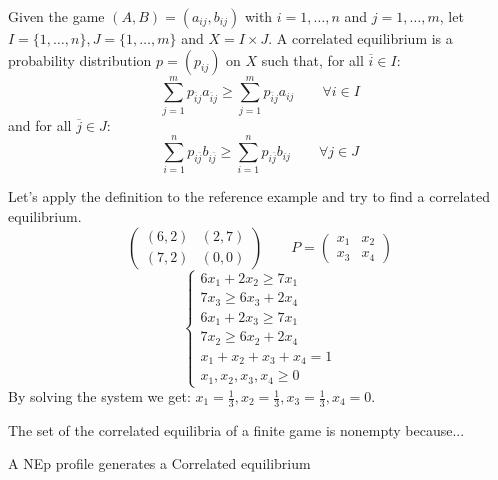 \documentclass[../main.tex]{subfiles}
\begin{document}
\begin{definition}
    Given the game $(A,B) = (a_{ij}, b_{ij})$ with $i = 1, \ldots, n$ and $j = 1, \ldots, m$, let $I = \{1, \ldots, n\}, J = \{1, \ldots, m\}$ and $X = I \times J$. A correlated equilibrium is a probability distribution $p = (p_{ij})$ on $X$ such that, for all $\overline{i} \in I$:
    \begin{equation*}
        \sum_{j=1}^{m} p_{\overline{i}j} a_{\overline{i}j} \geq \sum_{j=1}^{m} p_{\overline{i}j} a_{ij} \qquad \forall i \in I
    \end{equation*}
    and for all $\overline{j} \in J$:
    \begin{equation*}
        \sum_{i=1}^{n} p_{i\overline{j}} b_{i\overline{j}} \geq \sum_{i=1}^{n} p_{i\overline{j}} b_{ij} \qquad \forall j \in J
    \end{equation*}
\end{definition}

\begin{example}
    Let's apply the definition to the reference example and try to find a correlated equilibrium.
    \[
        \begin{pmatrix}
            (6,2) & (2,7) \\
            (7,2) & (0,0)
        \end{pmatrix}
        \qquad
        P = \begin{pmatrix}
            x_1 & x_2 \\
            x_3 & x_4
        \end{pmatrix}
    \]
    \[
        \begin{cases}
            6x_1 + 2x_2 \geq 7 x_1    \\
            7x_3 \geq 6x_3 + 2x_4     \\
            6x_1 + 2x_3 \geq 7 x_1    \\
            7x_2 \geq 6x_2 + 2x_4     \\
            x_1 + x_2 + x_3 + x_4 = 1 \\
            x_1, x_2, x_3, x_4 \geq 0
        \end{cases}
    \]
    By solving the system we get: $x_1 = \frac{1}{3}, x_2 = \frac{1}{3}, x_3 = \frac{1}{3}, x_4 = 0$.
\end{example}

The set of the correlated equilibria of a finite game is nonempty because...
\begin{theorem}
    A \gls{NEp} profile generates a Correlated equilibrium
\end{theorem}
\end{document}
